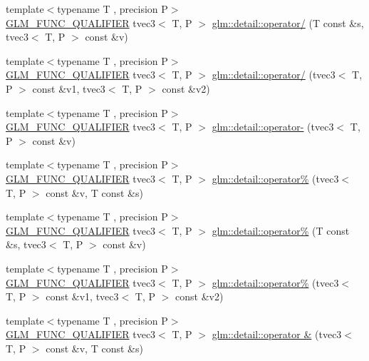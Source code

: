 \begin{DoxyCompactItemize}
{\footnotesize template$<$typename T , precision P$>$ }\\\hyperlink{setup_8hpp_a33fdea6f91c5f834105f7415e2a64407}{G\+L\+M\+\_\+\+F\+U\+N\+C\+\_\+\+Q\+U\+A\+L\+I\+F\+I\+ER} tvec3$<$ T, P $>$ \hyperlink{namespaceglm_1_1detail_a5ff38c646c1b0f2f5ce87b58a0ebacb9}{glm\+::detail\+::operator/} (T const \&s, tvec3$<$ T, P $>$ const \&v)
\item 
{\footnotesize template$<$typename T , precision P$>$ }\\\hyperlink{setup_8hpp_a33fdea6f91c5f834105f7415e2a64407}{G\+L\+M\+\_\+\+F\+U\+N\+C\+\_\+\+Q\+U\+A\+L\+I\+F\+I\+ER} tvec3$<$ T, P $>$ \hyperlink{namespaceglm_1_1detail_a68cc2e65e92d4f22a2b8dad5f07e161d}{glm\+::detail\+::operator/} (tvec3$<$ T, P $>$ const \&v1, tvec3$<$ T, P $>$ const \&v2)
\item 
{\footnotesize template$<$typename T , precision P$>$ }\\\hyperlink{setup_8hpp_a33fdea6f91c5f834105f7415e2a64407}{G\+L\+M\+\_\+\+F\+U\+N\+C\+\_\+\+Q\+U\+A\+L\+I\+F\+I\+ER} tvec3$<$ T, P $>$ \hyperlink{namespaceglm_1_1detail_afa7ba3ec4343e2981d54f9bcf86a5e3d}{glm\+::detail\+::operator-\/} (tvec3$<$ T, P $>$ const \&v)
\item 
{\footnotesize template$<$typename T , precision P$>$ }\\\hyperlink{setup_8hpp_a33fdea6f91c5f834105f7415e2a64407}{G\+L\+M\+\_\+\+F\+U\+N\+C\+\_\+\+Q\+U\+A\+L\+I\+F\+I\+ER} tvec3$<$ T, P $>$ \hyperlink{namespaceglm_1_1detail_ab45226d89ed3a0e64bb37f4d1a36f46b}{glm\+::detail\+::operator\%} (tvec3$<$ T, P $>$ const \&v, T const \&s)
\item 
{\footnotesize template$<$typename T , precision P$>$ }\\\hyperlink{setup_8hpp_a33fdea6f91c5f834105f7415e2a64407}{G\+L\+M\+\_\+\+F\+U\+N\+C\+\_\+\+Q\+U\+A\+L\+I\+F\+I\+ER} tvec3$<$ T, P $>$ \hyperlink{namespaceglm_1_1detail_aa0732cc34dfacc8a931ebb3f2ea56319}{glm\+::detail\+::operator\%} (T const \&s, tvec3$<$ T, P $>$ const \&v)
\item 
{\footnotesize template$<$typename T , precision P$>$ }\\\hyperlink{setup_8hpp_a33fdea6f91c5f834105f7415e2a64407}{G\+L\+M\+\_\+\+F\+U\+N\+C\+\_\+\+Q\+U\+A\+L\+I\+F\+I\+ER} tvec3$<$ T, P $>$ \hyperlink{namespaceglm_1_1detail_a19bf2452647ba8bc5642fb21f884d021}{glm\+::detail\+::operator\%} (tvec3$<$ T, P $>$ const \&v1, tvec3$<$ T, P $>$ const \&v2)
\item 
{\footnotesize template$<$typename T , precision P$>$ }\\\hyperlink{setup_8hpp_a33fdea6f91c5f834105f7415e2a64407}{G\+L\+M\+\_\+\+F\+U\+N\+C\+\_\+\+Q\+U\+A\+L\+I\+F\+I\+ER} tvec3$<$ T, P $>$ \hyperlink{namespaceglm_1_1detail_ae05034e37e81eb8b19f0586b286d0893}{glm\+::detail\+::operator \&} (tvec3$<$ T, P $>$ const \&v, T const \&s)

\end{DoxyCompactItemize}
